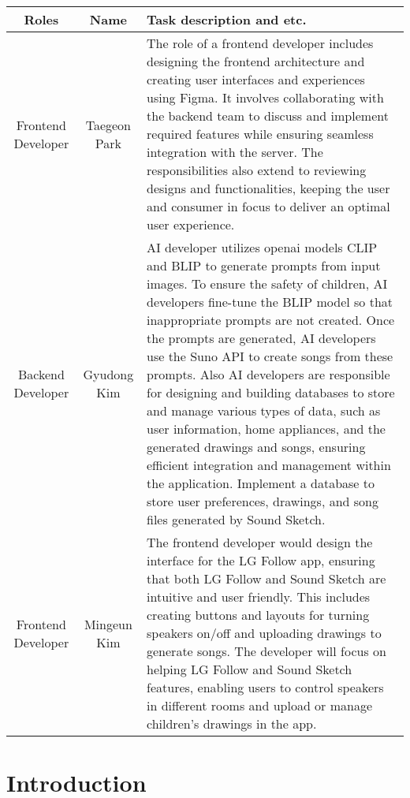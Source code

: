 \documentclass[conference]{IEEEtran}
\begin{document}
\vspace{0.8cm}

\begin{table}[h!]
\centering
\begin{tabular}{|c|c|p{3.5cm}|}
\hline
\textbf{Roles} & \textbf{Name} & \textbf{Task description and etc.} \\
\hline
Frontend Developer & Taegeon Park & The role of a frontend developer includes designing the frontend architecture and creating user interfaces and experiences using Figma. It involves collaborating with the backend team to discuss and implement required features while ensuring seamless integration with the server. The responsibilities also extend to reviewing designs and functionalities, keeping the user and consumer in focus to deliver an optimal user experience. \\
\hline
Backend Developer & Gyudong Kim & AI developer utilizes openai models CLIP and BLIP to generate prompts from input images. To ensure the safety of children, AI developers fine-tune the BLIP model so that inappropriate prompts are not created. Once the prompts are generated, AI developers use the Suno API to create songs from these prompts. Also AI developers are responsible for designing and building databases to store and manage various types of data, such as user information, home appliances, and the generated drawings and songs, ensuring efficient integration and management within the application. Implement a database to store user preferences, drawings, and song files generated by Sound Sketch. \\
\hline
Frontend Developer & Mingeun Kim & The frontend developer would design the interface for the LG Follow app, ensuring that both LG Follow and Sound Sketch are intuitive and user friendly. This includes creating buttons and layouts for turning speakers on/off and uploading drawings to generate songs. The developer will focus on helping LG Follow and Sound Sketch features, enabling users to control speakers in different rooms and upload or manage children's drawings in the app.  \\
\hline
\end{tabular}
\end{table}


\IEEEpeerreviewmaketitle

\section{Introduction}
\end{document}
